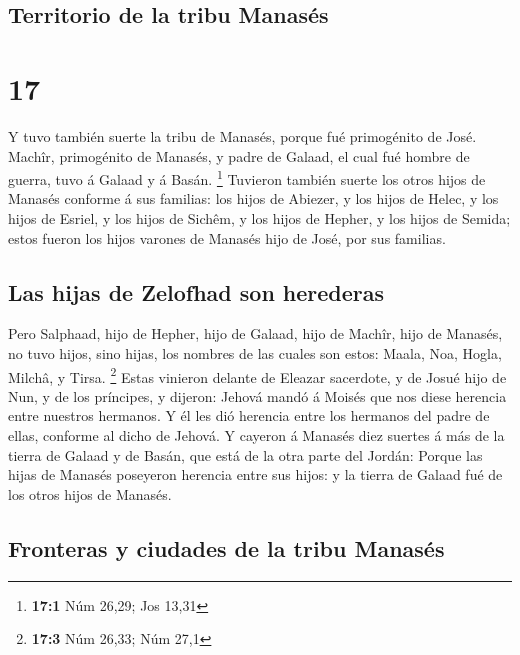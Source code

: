 \hypertarget{territorio-de-la-tribu-manasuxe9s}{%
\subsection{Territorio de la tribu
Manasés}\label{territorio-de-la-tribu-manasuxe9s}}

\hypertarget{section-16}{%
\section{17}\label{section-16}}

 Y tuvo también suerte la tribu de Manasés, porque fué
primogénito de José. Machîr, primogénito de Manasés, y padre de Galaad,
el cual fué hombre de guerra, tuvo á Galaad y á Basán. \footnote{\textbf{17:1}
  Núm 26,29; Jos 13,31}  Tuvieron también suerte los otros
hijos de Manasés conforme á sus familias: los hijos de Abiezer, y los
hijos de Helec, y los hijos de Esriel, y los hijos de Sichêm, y los
hijos de Hepher, y los hijos de Semida; estos fueron los hijos varones
de Manasés hijo de José, por sus familias.

\hypertarget{las-hijas-de-zelofhad-son-herederas}{%
\subsection{Las hijas de Zelofhad son
herederas}\label{las-hijas-de-zelofhad-son-herederas}}

 Pero Salphaad, hijo de Hepher, hijo de Galaad, hijo de
Machîr, hijo de Manasés, no tuvo hijos, sino hijas, los nombres de las
cuales son estos: Maala, Noa, Hogla, Milchâ, y Tirsa. \footnote{\textbf{17:3}
  Núm 26,33; Núm 27,1}  Estas vinieron delante de Eleazar
sacerdote, y de Josué hijo de Nun, y de los príncipes, y dijeron: Jehová
mandó á Moisés que nos diese herencia entre nuestros hermanos. Y él les
dió herencia entre los hermanos del padre de ellas, conforme al dicho de
Jehová.  Y cayeron á Manasés diez suertes á más de la tierra
de Galaad y de Basán, que está de la otra parte del Jordán: 
Porque las hijas de Manasés poseyeron herencia entre sus hijos: y la
tierra de Galaad fué de los otros hijos de Manasés.

\hypertarget{fronteras-y-ciudades-de-la-tribu-manasuxe9s}{%
\subsection{Fronteras y ciudades de la tribu
Manasés}\label{fronteras-y-ciudades-de-la-tribu-manasuxe9s}}

